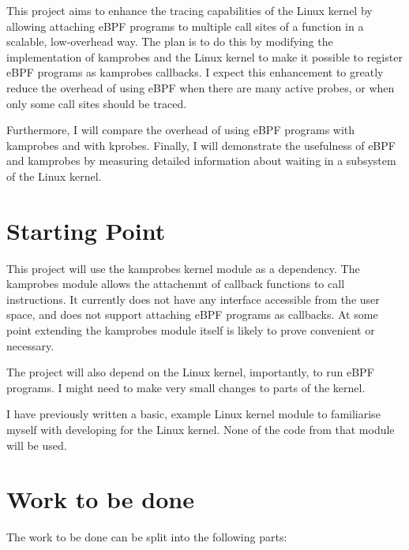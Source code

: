     This project aims to enhance the tracing capabilities of the Linux kernel by allowing attaching eBPF programs
    to multiple call sites of a function in a scalable, low-overhead way. 
    The plan is to do this by modifying the implementation of
    kamprobes and the Linux kernel to make it possible to register eBPF programs as kamprobes callbacks.
    I expect this enhancement to greatly reduce the overhead of using eBPF when there are many active probes,
    or when only some call sites should be traced.

    Furthermore, I will compare the overhead of using eBPF programs with kamprobes and with kprobes. 
    Finally, I will demonstrate the usefulness of eBPF and kamprobes by measuring detailed information 
    about waiting in a subsystem of the Linux kernel.
 
\section*{Starting Point}

    This project will use the kamprobes kernel module as a dependency.
    The kamprobes module allows the attachemnt of callback functions to call instructions.
    It currently does not have any interface accessible from the user space, and does not support
    attaching eBPF programs as callbacks.
    At some point extending the kamprobes module itself is likely to prove convenient or necessary.

    The project will also depend on the Linux kernel, importantly, to run eBPF programs.
    I might need to make very small changes to parts of the kernel.


    I have previously written a basic, example Linux kernel module to familiarise myself with developing for the 
    Linux kernel. None of the code from that module will be used. 

\section*{Work to be done}

    The work to be done can be split into the following parts:

